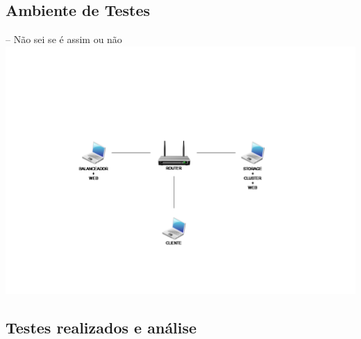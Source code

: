 \subsection{Ambiente de Testes}

-- Não sei se é assim ou não
\includegraphics[scale=.4]{img/AmbienteDeTestes}

\subsection{Testes realizados e análise}

